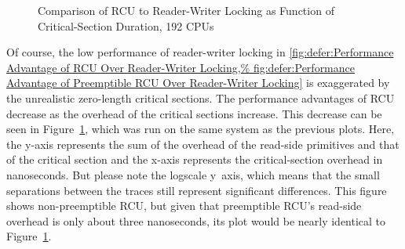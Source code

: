 \begin{figure}[tb]
\centering
{}
\caption{Comparison of RCU to Reader-Writer Locking as Function of Critical-Section Duration, 192 CPUs}
\label{fig:defer:Comparison of RCU to Reader-Writer Locking as Function of Critical-Section Duration}
\end{figure}

Of course, the low performance of reader-writer locking in
\cref{fig:defer:Performance Advantage of RCU Over Reader-Writer Locking,%
fig:defer:Performance Advantage of Preemptible RCU Over Reader-Writer Locking}
is exaggerated by the unrealistic zero-length critical sections.
The performance advantages of RCU decrease as the overhead of the critical
sections increase.
This decrease can be seen in
Figure~\ref{fig:defer:Comparison of RCU to Reader-Writer Locking as Function of Critical-Section Duration},
which was run on the same system as the previous plots.
Here, the y-axis represents the sum of the overhead of the read-side
primitives and that of the critical section and the x-axis represents
the critical-section overhead in nanoseconds.
But please note the logscale y~axis, which means that the small
separations between the traces still represent significant differences.
This figure shows non-preemptible RCU, but given that preemptible RCU's
read-side overhead is only about three nanoseconds, its plot would be
nearly identical to
Figure~\ref{fig:defer:Comparison of RCU to Reader-Writer Locking as Function of Critical-Section Duration}.

